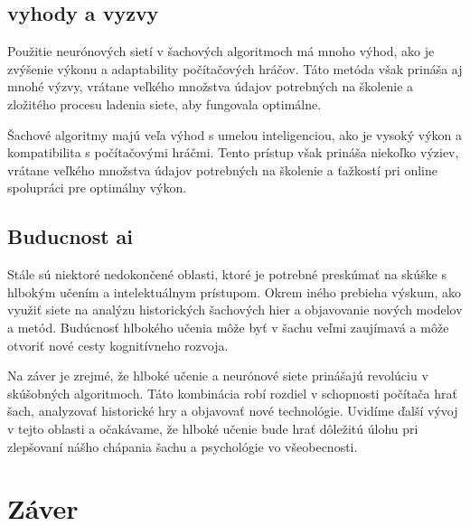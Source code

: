 \documentclass[10pt,twoside,slovak,a4paper]{article}
\begin{document}
\subsection {vyhody a vyzvy} \label{vyhodyAI}
Použitie neurónových sietí v šachových algoritmoch má mnoho výhod, ako je zvýšenie výkonu a adaptability počítačových hráčov. Táto metóda však prináša aj mnohé výzvy, vrátane veľkého množstva údajov potrebných na školenie a zložitého procesu ladenia siete, aby fungovala optimálne.

Šachové algoritmy majú veľa výhod s umelou inteligenciou, ako je vysoký výkon a kompatibilita s počítačovými hráčmi. Tento prístup však prináša niekoľko výziev, vrátane veľkého množstva údajov potrebných na školenie a ťažkostí pri online spolupráci pre optimálny výkon.

\subsection{Buducnost ai} \label{buducnostAI}
Stále sú niektoré nedokončené oblasti, ktoré je potrebné preskúmať na skúške s hlbokým učením a intelektuálnym prístupom. Okrem iného prebieha výskum, ako využiť siete na analýzu historických šachových hier a objavovanie nových modelov a metód. Budúcnosť hlbokého učenia môže byť v šachu veľmi zaujímavá a môže otvoriť nové cesty kognitívneho rozvoja.

Na záver je zrejmé, že hlboké učenie a neurónové siete prinášajú revolúciu v skúšobných algoritmoch. Táto kombinácia robí rozdiel v schopnosti počítača hrať šach, analyzovať historické hry a objavovať nové technológie. Uvidíme ďalší vývoj v tejto oblasti a očakávame, že hlboké učenie bude hrať dôležitú úlohu pri zlepšovaní nášho chápania šachu a psychológie vo všeobecnosti.
\section{Záver} \label{zaver} %






\end{document}
